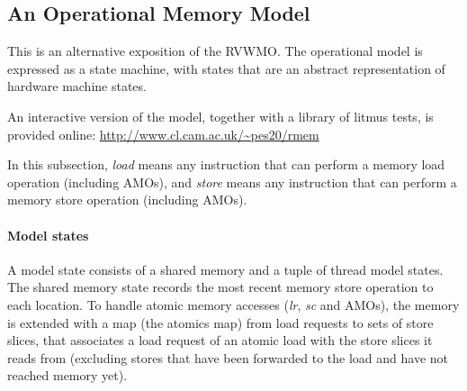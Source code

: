 \subsection{An Operational Memory Model}

This is an alternative exposition of the RVWMO.
The operational model is expressed as a state machine, with states that are an abstract representation of hardware machine states.

An interactive version of the model, together with a library of litmus tests,
is provided online: \url{http://www.cl.cam.ac.uk/~pes20/rmem}

In this subsection, {\em load} means any instruction that can perform a memory load operation (including AMOs), and {\em store} means any instruction that can perform a memory store operation (including AMOs).

\paragraph{Model states}
A model state consists of a shared memory and a tuple of thread model states.
%
%
%
%
The shared memory state records the most recent memory store operation to each location.
To handle atomic memory accesses ({\em  lr}, {\em sc} and AMOs), the memory is extended with a map (the atomics map) from load requests to sets of store slices, that associates a load request of an atomic load with the store slices it reads from (excluding stores that have been forwarded to the load and have not reached memory yet).

